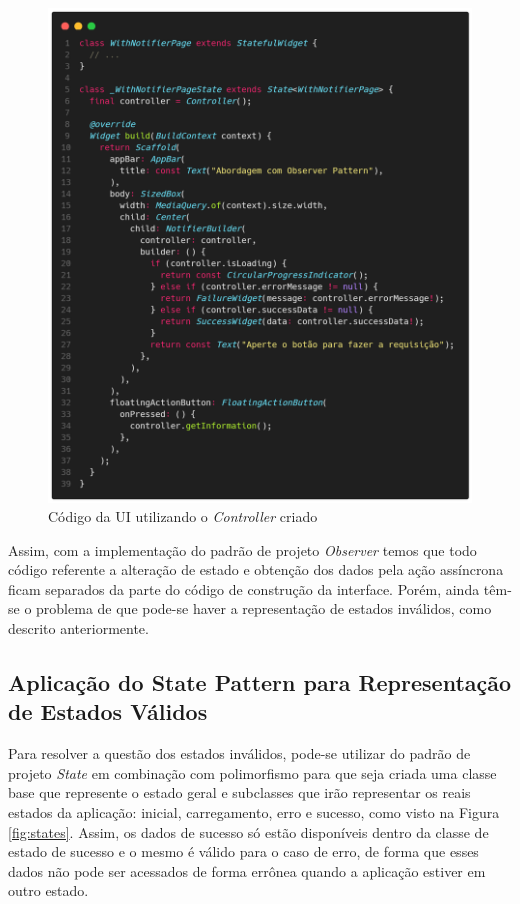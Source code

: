 \documentclass[12pt, %
openright, 
oneside, %
a4paper,    %
brazil]{facom-ufu-abntex2}
\begin{document}
\begin{figure}[ht]
    \centering
    \includegraphics[width=.65\textwidth, trim={0 30 0 100}, clip]{figures/states/with_notifier_page.png}
    \caption{Código da UI utilizando o \textit{Controller} criado}
    \label{fig:with_notifier_page}
\end{figure}

Assim, com a implementação do padrão de projeto \textit{Observer} temos que todo código referente a alteração de estado e obtenção dos dados pela ação assíncrona ficam separados da parte do código de construção da interface. Porém, ainda têm-se o problema de que pode-se haver a representação de estados inválidos, como descrito anteriormente.

\subsection{Aplicação do State Pattern para Representação de Estados Válidos}

Para resolver a questão dos estados inválidos, pode-se utilizar do padrão de projeto \textit{State} em combinação com polimorfismo para que seja criada uma classe base que represente o estado geral e subclasses que irão representar os reais estados da aplicação: inicial, carregamento, erro e sucesso, como visto na Figura \ref{fig:states}. Assim, os dados de sucesso só estão disponíveis dentro da classe de estado de sucesso e o mesmo é válido para o caso de erro, de forma que esses dados não pode ser acessados de forma errônea quando a aplicação estiver em outro estado.
\end{document}
